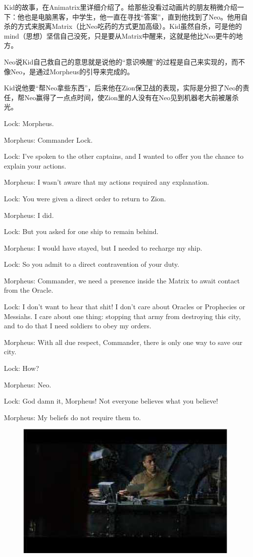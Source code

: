 \documentclass[UTF8]{ctexart}
\newenvironment{myquote}{\color{green} \setlength{\leftskip}{6em} \setlength{\rightskip}{4em} \setlength{\parindent}{-2em}}{\par}
\begin{document}
Kid的故事，在Animatrix里详细介绍了。给那些没看过动画片的朋友稍微介绍一下：他也是电脑黑客，中学生，他一直在寻找“答案”，直到他找到了Neo。他用自杀的方式来脱离Matrix（比Neo吃药的方式更加高级）。Kid虽然自杀，可是他的mind（思想）坚信自己没死，只是要从Matrix中醒来，这就是他比Neo更牛的地方。

Neo说Kid自己救自己的意思就是说他的“意识唤醒”的过程是自己来实现的，而不像Neo，是通过Morpheus的引导来完成的。

Kid说他要“帮Neo拿些东西”，后来他在Zion保卫战的表现，实际是分担了Neo的责任，帮Neo赢得了一点点时间，使Zion里的人没有在Neo见到机器老大前被屠杀光。

\begin{myquote}
Lock: Morpheus.

Morpheus: Commander Lock.

Lock: I've spoken to the other captains, and I wanted to offer you the chance to explain your actions.

Morpheus: I wasn't aware that my actions required any explanation.

Lock: You were given a direct order to return to Zion.

Morpheus: I did.

Lock: But you asked for one ship to remain behind.

Morpheus: I would have stayed, but I needed to recharge my ship.

Lock: So you admit to a direct contravention of your duty.

Morpheus: Commander, we need a presence inside the Matrix to await contact from the Oracle.

Lock: I don't want to hear that shit! I don't care about Oracles or Prophecies or Messiahs. I care about one thing: stopping that army from destroying this city, and to do that I need soldiers to obey my orders.

Morpheus: With all due respect, Commander, there is only one way to save our city.

Lock: How?

Morpheus: Neo.

Lock: God damn it, Morpheus! Not everyone believes what you believe!

Morpheus: My beliefs do not require them to.
\end{myquote}

\begin{figure}[htb]
\centering
\includegraphics[width=0.5\linewidth]{fig/read_reloaded-36}
\end{figure}
\end{document}
